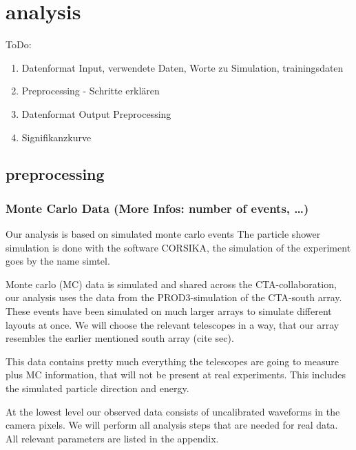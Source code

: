 \chapter{analysis}\label{analysis}

ToDo:
\begin{enumerate}[nosep]
    \item Datenformat Input, verwendete Daten, Worte zu Simulation, trainingsdaten
    \item Preprocessing - Schritte erklären
    \item Datenformat Output Preprocessing
    \item Signifikanzkurve
\end{enumerate}

\section{preprocessing}

\subsection{Monte Carlo Data (More Infos: number of events, \ldots)}
Our analysis is based on simulated monte carlo events
The particle shower simulation is done with the software CORSIKA, 
the simulation of the experiment goes by the name simtel.

Monte carlo (MC) data is simulated and shared across the CTA-collaboration, 
our analysis uses the data from the PROD3-simulation of 
the CTA-south array. These events have been simulated on
much larger arrays to simulate different layouts at once.
We will choose the relevant telescopes in a way, that
our array resembles the earlier mentioned south array (cite sec).

This data contains pretty much everything the telescopes are going to measure
plus MC information, that will not be present at real experiments.
This includes the simulated particle direction and energy.


At the lowest level our observed data consists of uncalibrated waveforms 
in the camera pixels.
We will perform all analysis steps that are needed for real data.
All relevant parameters are listed in the appendix.

